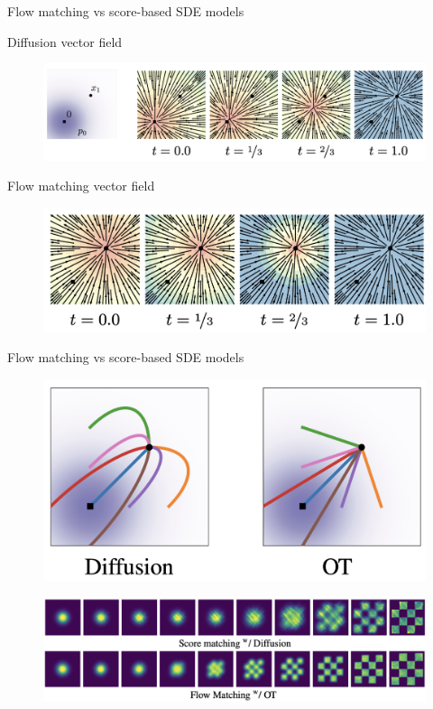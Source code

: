 \begin{frame}{Flow matching vs score-based SDE models}
	\begin{block}{Diffusion vector field}
		\begin{figure}
			\centering
			\includegraphics[width=\linewidth]{figs/diff_cond_path}
		\end{figure}
	\end{block}
	\begin{block}{Flow matching vector field}
		\begin{figure}
			\raggedleft
			\includegraphics[width=0.77\linewidth]{figs/ot_cond_path}
		\end{figure}
	\end{block}
\end{frame}
\begin{frame}{Flow matching vs score-based SDE models}
	\begin{figure}
		\centering
		\includegraphics[width=0.7\linewidth]{figs/trajectories}
	\end{figure}
	\begin{figure}
		\centering
		\includegraphics[width=\linewidth]{figs/2d-generation}
	\end{figure}
\end{frame}
